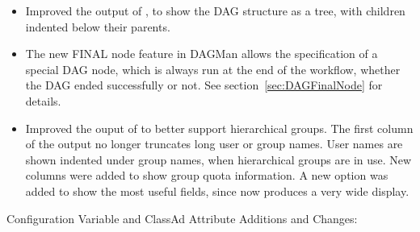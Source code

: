 \begin{itemize}
\item Improved the output of  ,
to show the DAG structure as a tree,
with children indented below their parents.

\item The new FINAL node feature in DAGMan allows the specification
of a special DAG node, 
which is always run at the end of the workflow,
whether the DAG ended successfully or not.
See section~\ref{sec:DAGFinalNode} for details.

\item Improved the ouput of  to better support hierarchical
groups. 
The first column of the output no longer truncates long user or group names.
User names are shown indented under group names,
when hierarchical groups are in use.
New columns were added to show group quota information.
A new  option was added to show 
the most useful fields,
since  now produces a very wide display.

\end{itemize}

\noindent Configuration Variable and ClassAd Attribute Additions and Changes:

